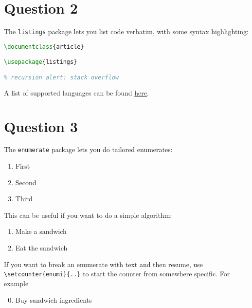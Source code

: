 \documentclass{article} %
\begin{document}
\section*{Question 2}
The \texttt{listings} package lets you list code verbatim, with some syntax highlighting:
\begin{lstlisting}[language=tex]
\documentclass{article}

\usepackage{listings}

% recursion alert: stack overflow
\end{lstlisting}
A list of supported languages can be found \href{https://en.wikibooks.org/wiki/LaTeX/Source_Code_Listings}{here}.


\section*{Question 3}
The \texttt{enumerate} package lets you do tailored enumerates:
\begin{enumerate}[I]
\item First
\item Second
\item Third
\end{enumerate}

This can be useful if you want to do a simple algorithm:
\begin{enumerate}[Step 1. ]
\item Make a sandwich
\item Eat the sandwich
\end{enumerate}

If you want to break an enumerate with text and then resume, use \verb|\setcounter{enumi}{..}| to start the counter from somewhere specific.  For example
\begin{enumerate}[Step 1. ]
\setcounter{enumi}{-1}
\item Buy sandwich ingredients
\end{enumerate} 
\end{document}
